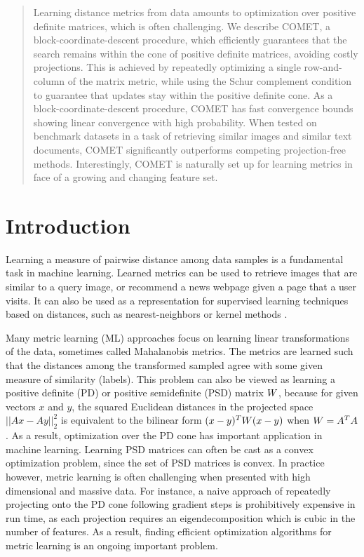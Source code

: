 \documentclass{article}
\begin{document}

\begin{abstract} 
Learning distance metrics from data amounts to optimization over positive definite matrices, which is often challenging. We describe COMET, a block-coordinate-descent procedure, which efficiently guarantees that the search remains within the cone of positive definite matrices, avoiding costly projections. 
This is achieved by repeatedly optimizing a single row-and-column of the matrix metric, while using the Schur complement condition to guarantee that updates stay within the positive definite cone. As a block-coordinate-descent procedure, COMET has fast convergence bounds showing linear convergence with high probability. When tested on benchmark datasets in a task of retrieving similar images and similar text documents, COMET significantly outperforms competing projection-free methods. Interestingly, COMET is naturally set up for learning metrics in face of a growing and changing feature set.
\end{abstract} 


\section{Introduction}
Learning a measure of pairwise distance among data samples is a fundamental task in machine learning. Learned metrics can be used to retrieve images that are similar to a query image, or recommend a news webpage given a page that a user visits. It can also be used as a representation for supervised learning techniques based on distances, such as nearest-neighbors or kernel methods \cite{kulis2012survey}. 

Many metric learning (ML) approaches focus on learning linear transformations of the data, sometimes called Mahalanobis metrics. The metrics are learned such that the distances among the transformed sampled agree with some given measure of similarity (labels). This problem can also be viewed as learning a positive definite (PD) or positive semidefinite (PSD) matrix ${W}$, because for given vectors $x$ and $y$, the squared Euclidean distances in the projected space $||Ax-Ay||^2_2$ is equivalent to the bilinear form $(x-y)^T{W}(x-y)$ when ${W}=A^TA$. As a result, optimization over the PD cone has important application in machine learning. 
Learning PSD matrices can often be cast as a convex optimization problem, since the set of PSD matrices is convex. In practice however, metric learning is often challenging when presented with high dimensional and massive data. For instance, a naive approach of repeatedly projecting onto the PD cone following gradient steps is prohibitively expensive in run time, as each projection requires an eigendecomposition which is cubic in the number of features. As a result, finding efficient optimization algorithms for metric learning is an ongoing important problem.
\end{document}
